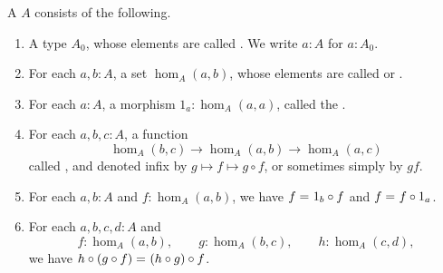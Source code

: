 \documentclass[hott-all.tex]{subfiles}
\begin{document}

\begin{defn}
  A 
  $A$ consists of the following.
  \begin{enumerate}
  \item A type $A_0$, whose elements are called .%
    We write $a:A$ for $a:A_0$.
  \item For each $a,b:A$, a set $\hom_A(a,b)$, whose elements are called  or .%
  \item For each $a:A$, a morphism $1_a:\hom_A(a,a)$, called the .%
  \item For each $a,b,c:A$, a function%
    \[  \hom_A(b,c) \to \hom_A(a,b) \to \hom_A(a,c) \]
    called , and denoted infix by $g\mapsto f\mapsto g\circ f$, or sometimes simply by $gf$.
  \item For each $a,b:A$ and $f:\hom_A(a,b)$, we have $f =_{} 1_b\circ f$ and $f =_{} f\circ 1_a$.
  \item For each $a,b,c,d:A$ and
    \begin{equation*}
      f:\hom_A(a,b), \qquad
      g:\hom_A(b,c), \qquad
      h:\hom_A(c,d),
    \end{equation*}
    we have $h\circ (g\circ f) =_{} (h\circ g)\circ f$.
  \end{enumerate}
\end{defn}
%
\end{document}
